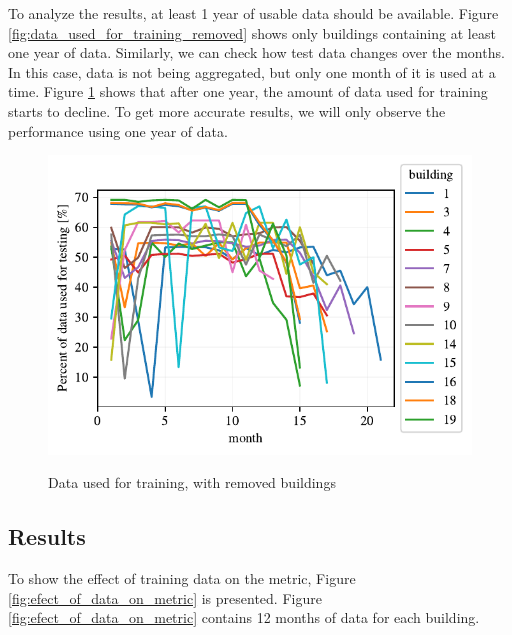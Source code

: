 To analyze the results, at least 1 year of usable data should be available.
Figure \ref{fig:data_used_for_training_removed} shows only buildings containing at least one year of data.
Similarly, we can check how test data changes over the months.
In this case, data is not being aggregated, but only one month of it is used at a time.
Figure \ref{fig:data_used_for_testing} shows that after one year,
the amount of data used for training starts to decline.
To get more accurate results, we will only observe the performance using one year of data.

\begin{figure}[H]
	\centering
	\caption{Data used for training, with removed buildings}
	\includegraphics[]{Figures/EC/DYN/data_used_for_testing.pdf}
	\label{fig:data_used_for_testing}
\end{figure}

\subsection{Results}

To show the effect of training data on the metric, Figure \ref{fig:efect_of_data_on_metric} is presented.
Figure \ref{fig:efect_of_data_on_metric} contains 12 months of data for each building.

